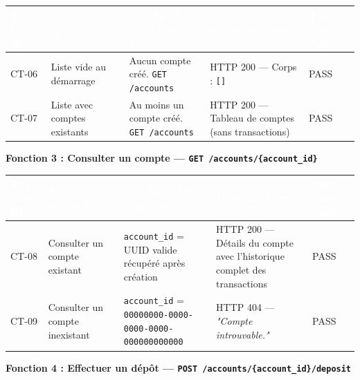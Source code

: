 \documentclass[12pt,a4paper]{article}
\begin{document}
\begin{longtable}{|L{1.6cm}|L{3.8cm}|L{5.2cm}|L{4.2cm}|L{1.8cm}|}
\hline
{}
\textbf{\textcolor{white}{Test Case ID}} & \textbf{\textcolor{white}{Test Case Description}} & \textbf{\textcolor{white}{Test Input (Test Case Value)}} & \textbf{\textcolor{white}{Expected Results}} & \textbf{\textcolor{white}{Test Case Status}} \\
\hline
CT-06 & Liste vide au démarrage & Aucun compte créé. \newline \texttt{GET /accounts} & HTTP 200 — Corps : \texttt{[]} & PASS \\
\hline
{}
CT-07 & Liste avec comptes existants & Au moins un compte créé. \newline \texttt{GET /accounts} & HTTP 200 — Tableau de comptes (sans transactions) & PASS \\
\hline
\end{longtable}

\vspace{0.2cm}
{\bfseries\textcolor{danger}{Fonction 3 : Consulter un compte — \texttt{GET /accounts/\{account\_id\}}}}
\vspace{0.1cm}

\begin{longtable}{|L{1.6cm}|L{3.8cm}|L{5.2cm}|L{4.2cm}|L{1.8cm}|}
\hline
{}
\textbf{\textcolor{white}{Test Case ID}} & \textbf{\textcolor{white}{Test Case Description}} & \textbf{\textcolor{white}{Test Input (Test Case Value)}} & \textbf{\textcolor{white}{Expected Results}} & \textbf{\textcolor{white}{Test Case Status}} \\
\hline
CT-08 & Consulter un compte existant & \texttt{account\_id} = UUID valide récupéré après création & HTTP 200 — Détails du compte avec l'historique complet des transactions & PASS \\
\hline
{}
CT-09 & Consulter un compte inexistant & \texttt{account\_id} = \texttt{00000000-0000-0000-0000-000000000000} & HTTP 404 — \textit{"Compte introuvable."} & PASS \\
\hline
\end{longtable}

\vspace{0.2cm}
{\bfseries\textcolor{danger}{Fonction 4 : Effectuer un dépôt — \texttt{POST /accounts/\{account\_id\}/deposit}}}
\vspace{0.1cm}
\end{document}
